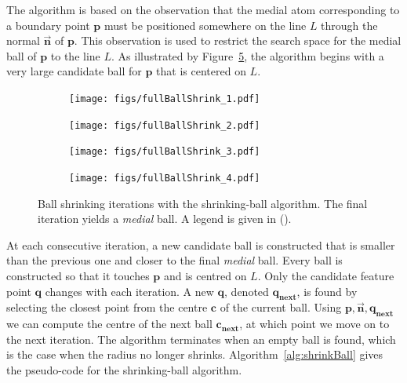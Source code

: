 The algorithm is based on the observation that the medial atom corresponding to a boundary point $\mathbf{p}$ must be positioned somewhere on the line $L$ through the normal $\vec{\mathbf{n}}$ of $\mathbf{p}$.
This observation is used to restrict the search space for the medial ball of $\mathbf{p}$ to the line $L$.
As illustrated by Figure~\ref{fig:shrinkballAlgo}, the algorithm begins with a very large candidate ball for $\mathbf{p}$ that is centered on $L$.
\begin{figure}[tbp]
	\begin{subfigure}{0.245\linewidth}
		\texttt{[image: figs/fullBallShrink\_1.pdf]}
		\label{fig:fullBallShrink_1}
	\end{subfigure}
	\begin{subfigure}{0.245\linewidth}
		\texttt{[image: figs/fullBallShrink\_2.pdf]}
		\label{fig:fullBallShrink_2}
	\end{subfigure}
	\begin{subfigure}{0.245\linewidth}
		\texttt{[image: figs/fullBallShrink\_3.pdf]}
		\label{fig:fullBallShrink_3}
	\end{subfigure}
	\begin{subfigure}{0.245\linewidth}
		\texttt{[image: figs/fullBallShrink\_4.pdf]}
		\label{fig:fullBallShrink_4}
	\end{subfigure}
	\caption{Ball shrinking iterations with the shrinking-ball algorithm. The final iteration yields a \emph{medial} ball. A legend is given in ().}
	\label{fig:shrinkballAlgo}
\end{figure}
At each consecutive iteration, a new candidate ball is constructed that is smaller than the previous one and closer to the final \emph{medial} ball.
Every ball is constructed so that it touches $\mathbf{p}$ and is centred on $L$.
Only the candidate feature point $\mathbf{q}$ changes with each iteration.
A new $\mathbf{q}$, denoted $\mathbf{q_{next}}$, is found by selecting the closest point from the centre $\mathbf{c}$ of the current ball.
Using $\mathbf{p}, \vec{\mathbf{n}}, \mathbf{q_{next}}$ we can compute the centre of the next ball $\mathbf{c_{next}}$, at which point we move on to the next iteration.
The algorithm terminates when an empty ball is found, which is the case when the radius no longer shrinks.
Algorithm~\ref{alg:shrinkBall} gives the pseudo-code for the shrinking-ball algorithm.
